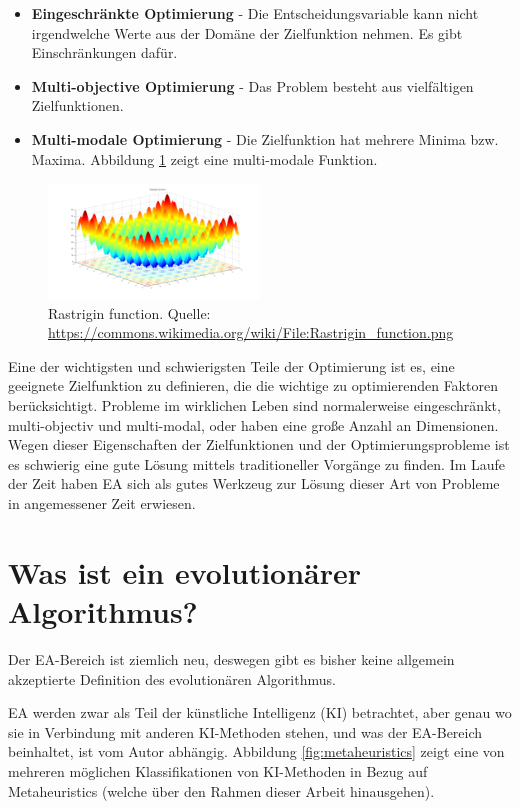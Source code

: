\documentclass[twoside,twocolumn]{article}
\begin{document}
\begin{itemize}
\item{\textbf{Eingeschränkte Optimierung} - Die Entscheidungsvariable kann nicht irgendwelche Werte aus der Domäne der Zielfunktion nehmen. Es gibt Einschränkungen dafür.}
\item{\textbf{Multi-objective Optimierung} - Das Problem besteht aus vielfältigen Zielfunktionen.}
\item{\textbf{Multi-modale Optimierung} - Die Zielfunktion hat mehrere Minima bzw. Maxima. Abbildung \ref{fig:rastrigin} zeigt eine multi-modale Funktion.}
\end{itemize}

\begin{figure}
\caption{Rastrigin function. Quelle: \url{https://commons.wikimedia.org/wiki/File:Rastrigin_function.png}}
\label{fig:rastrigin}
\centering
\includegraphics[width=0.5\textwidth]{images/rastrigin_function.png}
\end{figure}

Eine der wichtigsten und schwierigsten Teile der Optimierung ist es, eine geeignete Zielfunktion zu definieren, die die wichtige zu optimierenden Faktoren berücksichtigt.
Probleme im wirklichen Leben sind normalerweise eingeschränkt, multi-objectiv und multi-modal, oder haben eine große Anzahl an Dimensionen. Wegen dieser Eigenschaften der Zielfunktionen und der Optimierungsprobleme ist es schwierig eine gute Lösung mittels traditioneller Vorgänge zu finden. Im Laufe der Zeit haben EA sich als gutes Werkzeug zur Lösung dieser Art von Probleme in angemessener Zeit erwiesen.


\section{Was ist ein evolutionärer Algorithmus?}
Der EA-Bereich ist ziemlich neu, deswegen gibt es bisher keine allgemein akzeptierte Definition des evolutionären Algorithmus.\par
EA werden zwar als Teil der künstliche Intelligenz (KI) betrachtet, aber genau wo sie in Verbindung mit anderen KI-Methoden stehen, und was der EA-Bereich beinhaltet, ist vom Autor abhängig. Abbildung \ref{fig:metaheuristics} zeigt eine von mehreren möglichen Klassifikationen von KI-Methoden in Bezug auf Metaheuristics (welche über den Rahmen dieser Arbeit hinausgehen).
\end{document}
